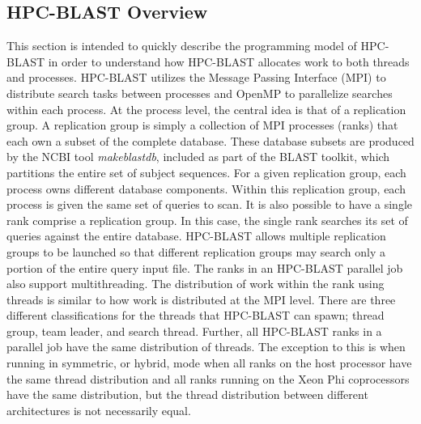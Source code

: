\documentclass[10pt]{article}
\begin{document}
\subsection{HPC-BLAST Overview} \label{ssec:hpc-overview}

This section is intended to quickly describe the programming model of HPC-BLAST in order to understand how HPC-BLAST allocates work to both threads and processes.  HPC-BLAST utilizes the Message Passing Interface (MPI) to distribute search tasks
between processes and OpenMP to parallelize searches within each process.  At the process level, the central idea is that of a replication group.  A replication group is simply a collection of MPI processes (ranks) that each own a subset of the complete
database.  These database subsets are produced by the NCBI tool \emph{makeblastdb}, included as part of the BLAST toolkit, which partitions the entire set of subject sequences.  For a given replication group, each process owns different database components.
Within this replication group, each process is given the same set of queries to scan.  It is also
possible to have a single rank comprise a replication group.  In this case, the single rank searches its set of queries against the entire database.  HPC-BLAST allows multiple replication groups to be launched so that different replication groups may search only a portion
of the entire query input file.  The ranks in an HPC-BLAST parallel job also support multithreading.  The distribution of work within the rank using threads is similar to how work is distributed at the MPI level.   There are three different classifications for the threads
that HPC-BLAST can spawn; thread group, team leader, and search thread.  Further, all HPC-BLAST ranks in a parallel job have the same distribution of threads.  The exception to this is when running in symmetric, or hybrid, mode when all ranks on the host processor have the same
thread distribution and all ranks running on the Xeon Phi coprocessors have the same distribution, but the thread distribution between different architectures is not necessarily equal.  
\end{document}
